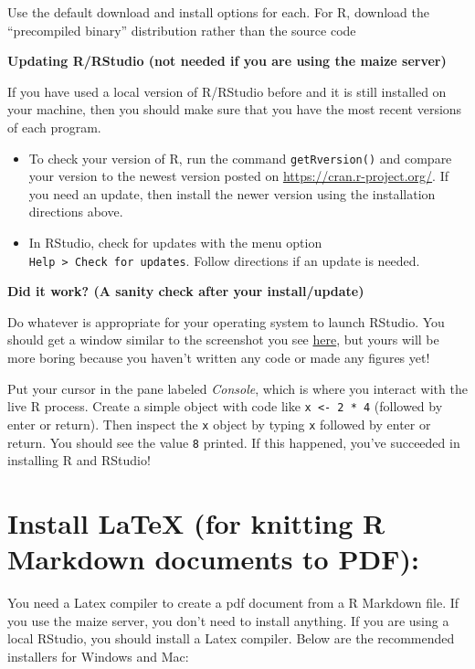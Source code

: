 \documentclass[
]{book}
\begin{document}
Use the default download and install options for each. For R, download the ``precompiled binary'' distribution rather than the source code

\textbf{Updating R/RStudio (not needed if you are using the maize server)}

If you have used a local version of R/RStudio before and it is still installed on your machine, then you should make sure that you have the most recent versions of each program.

\begin{itemize}
\item
  To check your version of R, run the command \texttt{getRversion()} and compare your version to the newest version posted on \url{https://cran.r-project.org/}. If you need an update, then install the newer version using the installation directions above.
\item
  In RStudio, check for updates with the menu option \texttt{Help\ \textgreater{}\ Check\ for\ updates}. Follow directions if an update is needed.
\end{itemize}

\textbf{Did it work? (A sanity check after your install/update)}

Do whatever is appropriate for your operating system to launch
RStudio. You should get a window similar to the screenshot you see
\href{https://www.rstudio.com/wp-content/uploads/2014/04/rstudio-workbench.png}{here},
but yours will be more boring because you haven't written any code
or made any figures yet!

Put your cursor in the pane labeled \emph{Console}, which is where you
interact with the live R process. Create a simple object with code
like \texttt{x\ \textless{}-\ 2\ *\ 4} (followed by enter or return). Then inspect the
\texttt{x} object by typing \texttt{x} followed by enter or return. You should see
the value \texttt{8} printed. If this happened, you've succeeded in
installing R and RStudio!

\hypertarget{install-latex-for-knitting-r-markdown-documents-to-pdf}{%
\section{Install LaTeX (for knitting R Markdown documents to PDF):}\label{install-latex-for-knitting-r-markdown-documents-to-pdf}}

You need a Latex compiler to create a pdf document from a R Markdown file. If you use the maize server, you don't need to install anything. If you are using a local RStudio, you should install a Latex compiler. Below are the recommended installers for Windows and Mac:
\end{document}

